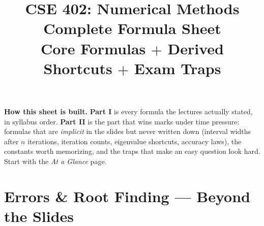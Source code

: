 \documentclass[11pt]{article}
\title{\textbf{\color{navy}CSE 402: Numerical Methods}\\[6pt]\Large\textbf{\color{gold}Complete Formula Sheet}\\[4pt]\large Core Formulas $+$ Derived Shortcuts $+$ Exam Traps}
\author{}
\date{}
\begin{document}
\maketitle
\vspace{-0.6cm}
\begin{center}
\begin{minipage}{0.9\textwidth}
\begin{keypoint}
\textbf{How this sheet is built.} \textbf{Part I} is every formula the lectures actually stated, in syllabus order. \textbf{Part II} is the part that wins marks under time pressure: formulas that are \emph{implicit} in the slides but never written down (interval widths after $n$ iterations, iteration counts, eigenvalue shortcuts, accuracy laws), the constants worth memorizing, and the traps that make an easy question look hard. Start with the \emph{At a Glance} page.
\end{keypoint}
\end{minipage}
\end{center}
\vspace{4pt}

\tableofcontents
\newpage





\section{Errors \& Root Finding --- Beyond the Slides}
\end{document}
